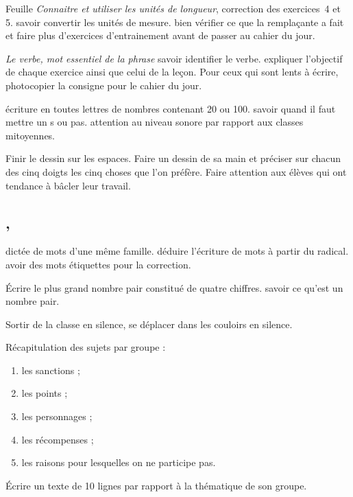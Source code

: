 \documentclass{article}
\begin{document}
	\dIs\cma{} Feuille \emph{Connaitre et utiliser les unités de longueur}, correction des exercices~4 et 5.
	\obj savoir convertir les unités de mesure.
	\bil bien vérifier ce que la remplaçante a fait et faire plus d’exercices d’entrainement avant de passer au cahier du jour.
	
	\dIs\cfr{} \textit{Le verbe, mot essentiel de la phrase}
	\obj savoir identifier le verbe.
	\bil expliquer l’objectif de chaque exercice ainsi que celui de la leçon. Pour ceux qui sont lents à écrire, photocopier la consigne pour le cahier du jour.
	
	\dIs\cma{}
	\Ard écriture en toutes lettres de nombres contenant 20 ou 100.
	\obj savoir quand il faut mettre un \og s \fg{} ou pas.
	\bil attention au niveau sonore par rapport aux classes mitoyennes.
	
	\dIs\car{} Finir le dessin sur les espaces. Faire un dessin de sa main et préciser sur chacun des cinq doigts les cinq \og choses \fg{} que l’on préfère.
	\bil Faire attention aux élèves qui ont tendance à bâcler leur travail.
	
	
	\subsection{ \sep}
	\dis\cfr{}
	\ard dictée de mots d’une même famille.
	\obj déduire l’écriture de mots à partir du radical.
	\bil avoir des mots étiquettes pour la correction.
	
	\dis\cma{}
	 Écrire le plus grand nombre pair constitué de quatre chiffres.
	\obj savoir ce qu’est un nombre pair.
	
	\dIs\cge{} Sortir de la classe en silence, se déplacer dans les couloirs en silence.
	
	\dIs\cpr{} Récapitulation des sujets par groupe :
	\begin{enumerate}
		\item les sanctions ;
		\item les points ;
		\item les personnages ;
		\item les récompenses ;
		\item les raisons pour lesquelles on ne participe pas.
	\end{enumerate}
	
	\dev
	\sdl\bcb\cpr\ppd Écrire un texte de 10 lignes par rapport à la thématique de son groupe.
	
\end{document}
